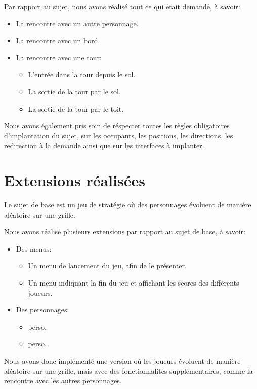 Par rapport au sujet, nous avons réalisé tout ce qui était demandé, à savoir:

\begin{itemize}
    \item La rencontre avec un autre personnage.
    \item La rencontre avec un bord.
    \item La rencontre avec une tour:
    \begin{itemize}
        \item L'entrée dans la tour depuis le sol.
        \item La sortie de la tour par le sol.
        \item La sortie de la tour par le toit.
    \end{itemize}
\end{itemize}
\bigskip

Nous avons également pris soin de réspecter toutes les règles obligatoires d'implantation du sujet, sur les occupants, les positions, les directions, les redirection à la demande ainsi que sur les interfaces à implanter.

\section{Extensions réalisées}

Le sujet de base est un jeu de stratégie où des personnages évoluent de manière aléatoire sur une grille.

Nous avons réalisé plusieurs extensions par rapport au sujet de base, à savoir:

\begin{itemize}
    \item Des menus:
    \begin{itemize}
        \item Un menu de lancement du jeu, afin de le présenter.
        \item Un menu indiquant la fin du jeu et affichant les scores des différents joueurs.
    \end{itemize}
    \item Des personnages:
    \begin{itemize}
        \item \textcolor{cardinal}{perso}.
        \item \textcolor{cardinal}{perso}.
    \end{itemize}
\end{itemize}
\bigskip

Nous avons donc implémenté une version où les joueurs évoluent de manière aléatoire sur une grille, mais avec des fonctionnalités supplémentaires, comme la rencontre avec les autres personnages.